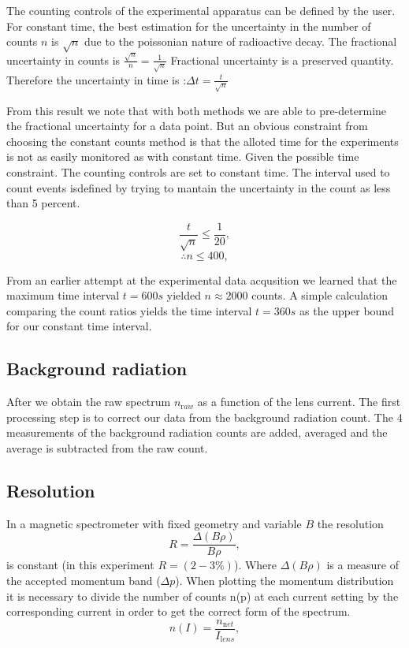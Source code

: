 \documentclass[9pt, a4paper]{article}
\begin{document}
\begin{multicols}{2}
The counting controls of the experimental apparatus can be defined by the user.
For constant time, the best estimation for the uncertainty in the number of counts $n$ is $\sqrt{n}$\cite{SPA} due to the poissonian nature of radioactive decay. 
The fractional uncertainty in counts is $\frac{\sqrt{n}}{n} = \frac{1}{\sqrt{n}}$
Fractional uncertainty is a preserved quantity. Therefore the uncertainty in time
is :$ \Delta t = \frac{t}{\sqrt{n}}$ 

From this result we note that with both methods we are able to pre-determine the fractional uncertainty for a data point. 
But an obvious constraint from choosing the constant counts method is that the alloted time for the experiments is not as easily monitored as with constant time. 
Given the possible time constraint. The counting controls are set to constant time. 
The interval used to count events isdefined by trying to mantain the uncertainty in the count as less than 5 percent.

\begin{equation}\frac{t}{\sqrt{n}} \leq \frac{1}{20},
\end{equation}
\begin{equation}\therefore n \leq 400,
\end{equation}

From an earlier attempt at the experimental data acqusition we learned that the maximum time interval $t = 600s$ yielded  $n \approx 2000$ counts. A simple calculation comparing the count ratios yields the time interval $t = 360s$ as the upper bound for our constant time interval.

\subsection{Background radiation}

After we obtain the raw spectrum $n_{\mathrm raw}$ as a function of the lens current. The first processing step is to correct our data from the background radiation count.
The 4 measurements of the background radiation counts are added, averaged and the average is subtracted from the raw count.

\subsection{Resolution}

In a magnetic spectrometer with fixed geometry and variable $B$ the resolution 
\begin{equation}R = \frac{\Delta(B \rho)}{B \rho},
\end{equation}
is constant (in this experiment $R = (2-3\%)$). 
Where $\Delta(B \rho)$ is a measure of the accepted momentum band ($\Delta p$). 
When plotting the momentum distribution it is necessary to divide the number of counts n(p) at each current setting by the corresponding current in order to get the correct form of the spectrum\cite{Siegbahn}.
\begin{equation} n(I) = \frac{n_{\mathrm net}}{I_{\mathrm lens}},
\end{equation}


\end{multicols}
\end{document}
